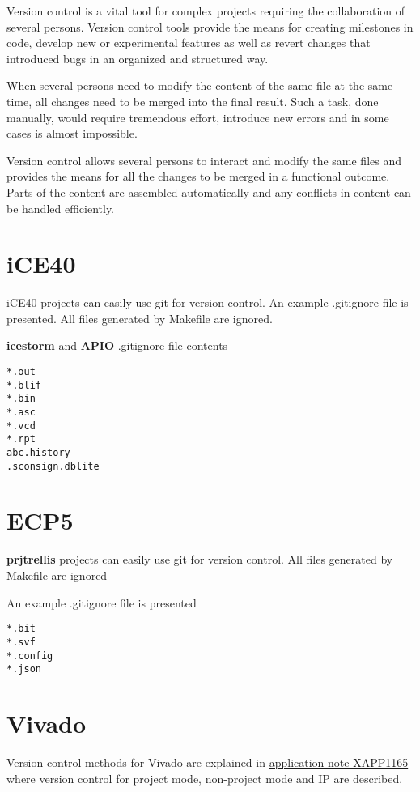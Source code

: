 Version control is a vital tool for complex projects requiring the collaboration of several persons.
Version control tools provide the means for creating milestones in code, develop new or experimental features as well as revert changes that introduced bugs in an organized and structured way.

When several persons need to modify the content of the same file at the same time, all changes need to be merged into the final result. Such a task, done manually, would require tremendous effort, introduce new errors and in some cases is almost impossible. 

Version control allows several persons to interact and modify the same files and provides the means for all the changes to be merged in a functional outcome.  Parts of the content are assembled automatically and any conflicts in content can be handled efficiently.

\section{iCE40}
iCE40 projects can easily use git for version control. An example .gitignore file is presented. All files generated by Makefile are ignored.

\textbf{icestorm} and \textbf{APIO} .gitignore file contents
\begin{tcolorbox}
\begin{verbatim}
*.out
*.blif
*.bin
*.asc
*.vcd
*.rpt
abc.history
.sconsign.dblite
\end{verbatim}
\end{tcolorbox}

\section{ECP5}
\textbf{prjtrellis} projects can easily use git for version control. All files generated by Makefile are ignored

An example .gitignore file is presented
\begin{tcolorbox}
\begin{verbatim}
*.bit
*.svf
*.config
*.json
\end{verbatim}
\end{tcolorbox}

\section{Vivado}
Version control methods for Vivado are explained in  \href{https://www.xilinx.com/support/documentation/application_notes/xapp1165.pdf}{application note XAPP1165} where version control for project mode, non-project mode and IP are described.

